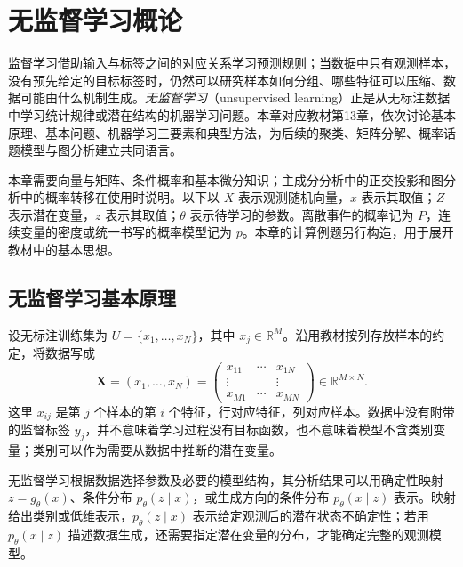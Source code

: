 \setcounter{chapter}{12} %
\chapter{无监督学习概论}
\label{ch:lh-unsupervised-overview}

监督学习借助输入与标签之间的对应关系学习预测规则；当数据中只有观测样本，没有预先给定的目标标签时，仍然可以研究样本如何分组、哪些特征可以压缩、数据可能由什么机制生成。\emph{无监督学习}（unsupervised learning）正是从无标注数据中学习统计规律或潜在结构的机器学习问题。本章对应教材第13章，依次讨论基本原理、基本问题、机器学习三要素和典型方法，为后续的聚类、矩阵分解、概率话题模型与图分析建立共同语言。

本章需要向量与矩阵、条件概率和基本微分知识；主成分分析中的正交投影和图分析中的概率转移在使用时说明。以下以 $X$ 表示观测随机向量，$x$ 表示其取值；$Z$ 表示潜在变量，$z$ 表示其取值；$\theta$ 表示待学习的参数。离散事件的概率记为 $P$，连续变量的密度或统一书写的概率模型记为 $p$。本章的计算例题另行构造，用于展开教材中的基本思想。

\section{无监督学习基本原理}
\label{sec:lh-unsup-principles}

设无标注训练集为 $U=\{x_1,\ldots,x_N\}$，其中 $x_j\in\mathbb R^M$。沿用教材按列存放样本的约定，将数据写成
\begin{equation}
\mathbf X=(x_1,\ldots,x_N)
=\begin{pmatrix}
x_{11}&\cdots&x_{1N}\\
\vdots&&\vdots\\
x_{M1}&\cdots&x_{MN}
\end{pmatrix}\in\mathbb R^{M\times N}.
\label{eq:lh-unsup-data-matrix}
\end{equation}
这里 $x_{ij}$ 是第 $j$ 个样本的第 $i$ 个特征，行对应特征，列对应样本。数据中没有附带的监督标签 $y_j$，并不意味着学习过程没有目标函数，也不意味着模型不含类别变量；类别可以作为需要从数据中推断的潜在变量。

\begin{definition}[无监督学习的模型形式]
\label{def:lh-unsup-models}
无监督学习根据数据选择参数及必要的模型结构，其分析结果可以用确定性映射 $z=g_\theta(x)$、条件分布 $p_\theta(z\mid x)$，或生成方向的条件分布 $p_\theta(x\mid z)$ 表示。映射给出类别或低维表示，$p_\theta(z\mid x)$ 表示给定观测后的潜在状态不确定性；若用 $p_\theta(x\mid z)$ 描述数据生成，还需要指定潜在变量的分布，才能确定完整的观测模型。
\end{definition}

